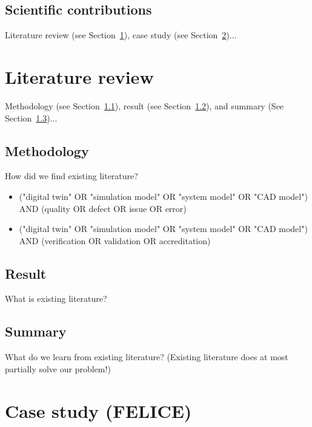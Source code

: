 \documentclass[conference]{IEEEtran}
\begin{document}
    \subsection{Scientific contributions}

    Literature review (see Section~\ref{section:literature}), case study (see Section~\ref{section:case})...
    
    \section{Literature review}
    \label{section:literature}

    Methodology (see Section~\ref{section:liteature_methodology}), result (see Section~\ref{section:liteature_result}), and summary (See Section~\ref{section:liteature_summary})...

    \subsection{Methodology}
    \label{section:liteature_methodology}

    How did we find existing literature?
    
    \begin{itemize}
        \item ("digital twin" OR "simulation model" OR "system model" OR "CAD model") AND (quality OR defect OR issue OR error)
        \item ("digital twin" OR "simulation model" OR "system model" OR "CAD model") AND (verification OR validation OR accreditation)
    \end{itemize}

    \subsection{Result}
    \label{section:liteature_result}

    What is existing literature?

    \subsection{Summary}
    \label{section:liteature_summary}

    What do we learn from existing literature?
    (Existing literature does at most partially solve our problem!)

    \section{Case study (FELICE)}
    \label{section:case}
\end{document}
